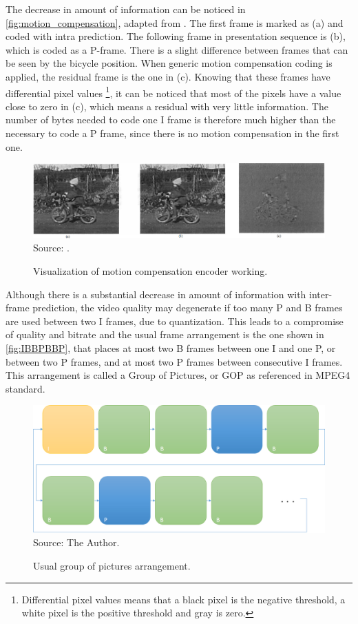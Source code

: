 \documentclass[
	12pt,				%
	openright,			%
	twoside,			%
	a4paper,			%
	brazil,
	french,				%
	english
	]{abntex2}
\begin{document}
The decrease in amount of information can be noticed in \autoref{fig:motion_compensation}, adapted from \cite{richardson}. The first frame is marked as (a) and coded with intra prediction. The following frame in presentation sequence is (b), which is coded as a P-frame. There is a slight difference between frames that can be seen by the bicycle position. When generic motion compensation coding is applied, the residual frame is the one in (c). Knowing that these frames have differential pixel values \footnote{Differential pixel values means that a black pixel is the negative threshold, a white pixel is the positive threshold and gray is zero.}, it can be noticed that most of the pixels have a value close to zero in (c), which means a residual with very little information. The number of bytes needed to code one I frame is therefore much higher than the necessary to code a P frame, since there is no motion compensation in the first one.

\begin{figure}
\centering
\caption{Visualization of motion compensation encoder working.}
\includegraphics[width=1\linewidth]{figuras/motion_compensation.png}
\\Source: \cite{richardson}.
\label{fig:motion_compensation}
\end{figure}

Although there is a substantial decrease in amount of information with inter-frame prediction, the video quality may degenerate if too many P and B frames are used between two I frames, due to quantization. This leads to a compromise of quality and bitrate and the usual frame arrangement is the one shown in \autoref{fig:IBBPBBP}, that places at most two B frames between one I and one P, or between two P frames, and at most two P frames between consecutive I frames. This arrangement is called a Group of Pictures, or GOP as referenced in MPEG4 standard.

\begin{figure}
\centering
\caption{Usual group of pictures arrangement.}
\includegraphics[width=0.6\linewidth]{figuras/IBBPBBP.png}
\\Source: The Author.
\label{fig:IBBPBBP}
\end{figure}
\end{document}
